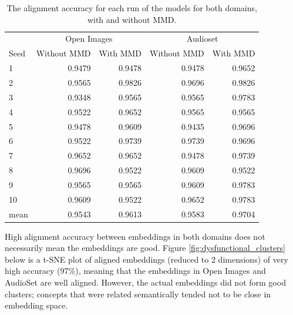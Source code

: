 \begin{table}[H]
\centering
\begin{tabular}{lrrrr}
  \toprule
 \multicolumn{1}{c}{} & \multicolumn{2}{c}{Open Images} & \multicolumn{2}{c}{Audioset} \\
 \cmidrule(lr){2-3} \cmidrule(lr){4-5}
{Seed} &    Without MMD &   With MMD   &  Without MMD &   With MMD \\
\midrule
1    &       0.9479 &        0.9478&    0.9478 &  0.9652  \\
2    &       0.9565 &        0.9826&    0.9696 &  0.9826  \\
3    &       0.9348 &        0.9565&    0.9565 &  0.9783  \\
4    &       0.9522 &        0.9652&    0.9565 &  0.9565  \\
5    &       0.9478 &        0.9609&    0.9435 &  0.9696  \\
6    &       0.9522 &        0.9739&    0.9739 &  0.9696  \\
7    &       0.9652 &        0.9652&    0.9478 &  0.9739  \\
8    &       0.9696 &        0.9522&    0.9609 &  0.9522  \\
9    &       0.9565 &        0.9565&    0.9609 &  0.9783  \\
10   &       0.9609 &        0.9522&    0.9652 &  0.9783  \\
\midrule                                                         
mean &       0.9543 &        0.9613 &   0.9583 &  0.9704  \\
\bottomrule
\end{tabular}
\caption{The alignment accuracy for each run of the models for both domains, with and without MMD.}
\end{table}

High alignment accuracy between embeddings in both domains does not necessarily mean the embeddings are good. Figure \ref{fig:dysfunctional_clusters} below is a t-SNE plot of aligned embeddings (reduced to 2 dimensions) of very high accuracy (97\%), meaning that the embeddings in Open Images and AudioSet are well aligned. However, the actual embeddings did not form good clusters; concepts that were related semantically tended not to be close in embedding space. 

